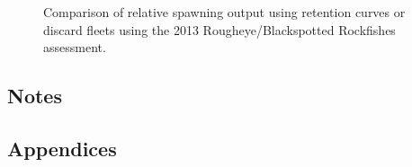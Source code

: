 \documentclass[
]{scrartcl}
\begin{document}
\begin{figure}


\caption{\label{fig-Discard_comp_RSS}Comparison of relative spawning
output using retention curves or discard fleets using the 2013
Rougheye/Blackspotted Rockfishes assessment.}

\end{figure}%

\newpage{}

\subsection{Notes}\label{notes}

\newpage{}

\subsection*{Appendices}\label{sec-appendix}
\end{document}
